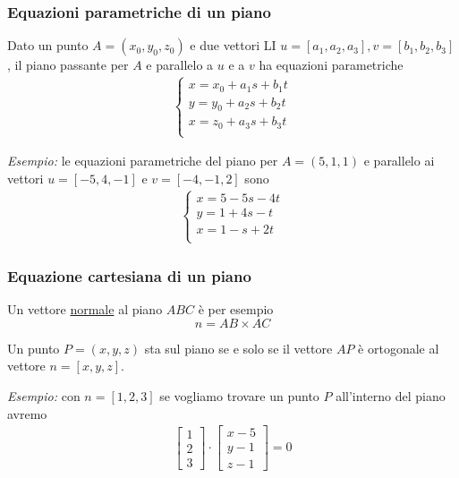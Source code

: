 \documentclass[../main.tex]{subfiles}
\begin{document}
\vspace{1cm}
\subsubsection{Equazioni parametriche di un piano}
Dato un punto $A = (x_0,y_0,z_0)$ e due vettori LI $u=[a_1,a_2,a_3], v=[b_1,b_2,b_3]$, il piano passante per $A$ e parallelo a $u$ e a $v$
ha equazioni parametriche
\begin{align*}
    \begin{cases}
        x = x_0 + a_1s + b_1t \\
        y = y_0 + a_2s + b_2t \\
        x = z_0 + a_3s + b_3t \\
    \end{cases}
\end{align*}

\textit{Esempio:} le equazioni parametriche del piano per $A=(5,1,1)$ e parallelo ai vettori $u=[-5,4,-1]$ e $v=[-4,-1,2]$ sono
\begin{align*}
    \begin{cases}
        x = 5 - 5s -4t \\
        y = 1 + 4s -t \\
        x = 1 -s + 2t \\
    \end{cases}
\end{align*}

\vspace{1cm}
\subsubsection{Equazione cartesiana di un piano}
Un vettore \underline{normale} al piano $ABC$ è per esempio
$$
    n = AB \times AC
$$

Un punto $P=(x,y,z)$ sta sul piano se e solo se il vettore $AP$ è ortogonale al vettore $n=[x,y,z]$.

\textit{Esempio:} con $n = [1,2,3]$ se vogliamo trovare un punto $P$ all'interno del piano avremo
\begin{align*}
    \begin{bmatrix}
        1 \\
        2 \\
        3
    \end{bmatrix} \cdot
    \begin{bmatrix}
        x-5 \\
        y-1 \\
        z-1
    \end{bmatrix}
    = 0
\end{align*} 
\end{document}
